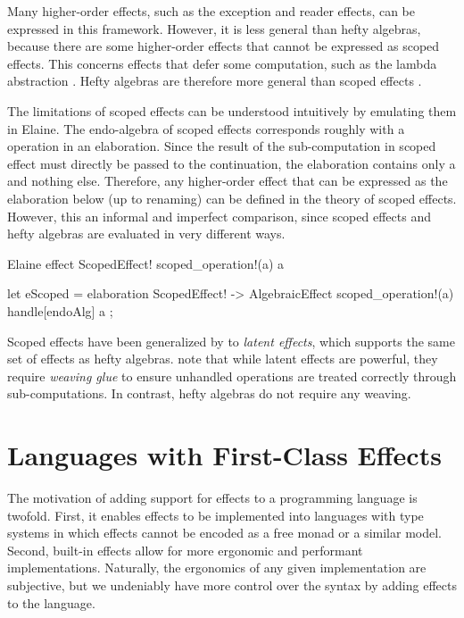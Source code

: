 Many higher-order effects, such as the exception and reader effects, can be expressed in this framework. However, it is less general than hefty algebras, because there are some higher-order effects that cannot be expressed as scoped effects. This concerns effects that defer some computation, such as the lambda abstraction \autocite{oh_latent_2021}. Hefty algebras are therefore more general than scoped effects \autocite{bach_poulsen_hefty_2023}.

The limitations of scoped effects can be understood intuitively by emulating them in Elaine. The endo-algebra of scoped effects corresponds roughly with a  operation in an elaboration. Since the result of the sub-computation in scoped effect must directly be passed to the continuation, the elaboration contains only a  and nothing else. Therefore, any higher-order effect that can be expressed as the elaboration below (up to renaming) can be defined in the theory of scoped effects. However, this an informal and imperfect comparison, since scoped effects and hefty algebras are evaluated in very different ways.

\begin{lst}{Elaine}
effect ScopedEffect! {
    scoped_operation!(a) a
}

let eScoped = elaboration ScopedEffect! -> AlgebraicEffect {
    scoped_operation!(a) {
        handle[endoAlg] a
    }
};
\end{lst}
%
Scoped effects have been generalized by \textcite{oh_latent_2021} to \emph{latent effects}, which supports the same set of effects as hefty algebras. \textcite{bach_poulsen_hefty_2023} note that while latent effects are powerful, they require \emph{weaving glue} to ensure unhandled operations are treated correctly through sub-computations. In contrast, hefty algebras do not require any weaving.

\section{Languages with First-Class Effects}

The motivation of adding support for effects to a programming language is twofold. First, it enables effects to be implemented into languages with type systems in which effects cannot be encoded as a free monad or a similar model. Second, built-in effects allow for more ergonomic and performant implementations. Naturally, the ergonomics of any given implementation are subjective, but we undeniably have more control over the syntax by adding effects to the language.

